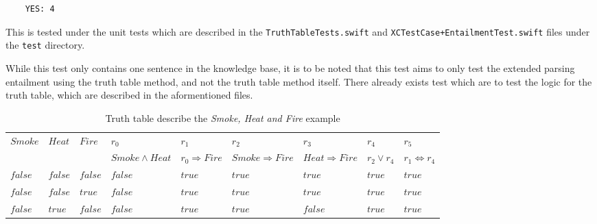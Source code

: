 \begin{verbatim}
    YES: 4
\end{verbatim}

This is tested under the unit tests which are described in the
\texttt{TruthTableTests.swift} and \texttt{XCTestCase+EntailmentTest.swift}
files under the \texttt{test} directory.

While this test only contains one sentence in the knowledge base, it is to be
noted that this test aims to only test the extended parsing entailment using the
truth table method, and not the truth table method itself. There already exists
test which are to test the logic for the truth table, which are described in the
aformentioned files.

\begin{sidewaystable}
    \centering
    \caption{Truth table describe the \emph{Smoke, Heat and Fire} example}
    \label{tab:smoketable}
    \begin{tabular}{l|l|l||l|l|l|l|l|l}
    \hline
    \multirow{2}{*}{\textbf{$Smoke$}} & \multirow{2}{*}{\textbf{$Heat$}} & \multirow{2}{*}{\textbf{$Fire$}} & \textbf{$r_{0}$}             & \textbf{$r_{1}$}                  & \textbf{$r_{2}$}                  & \textbf{$r_{3}$}                 & \textbf{$r_{4}$}            & \textbf{$r_{5}$}                       \\ \cline{4-9}
                                      &                                  &                                  & \textbf{$Smoke \wedge Heat$} & \textbf{$r_{0} \Rightarrow Fire$} & \textbf{$Smoke \Rightarrow Fire$} & \textbf{$Heat \Rightarrow Fire$} & \textbf{$r_{2} \vee r_{4}$} & \textbf{$r_{1} \Leftrightarrow r_{4}$} \\ \hline
    $false$                           & $false$                          & $false$                          & $false$                      & $true$                            & $true$                            & $true$                           & $true$                      & $true$                                 \\
    $false$                           & $false$                          & $true$                           & $false$                      & $true$                            & $true$                            & $true$                           & $true$                      & $true$                                 \\
    $false$                           & $true$                           & $false$                          & $false$                      & $true$                            & $true$                            & $false$                          & $true$                      & $true$                                 \\

\end{tabular}
\end{sidewaystable}
